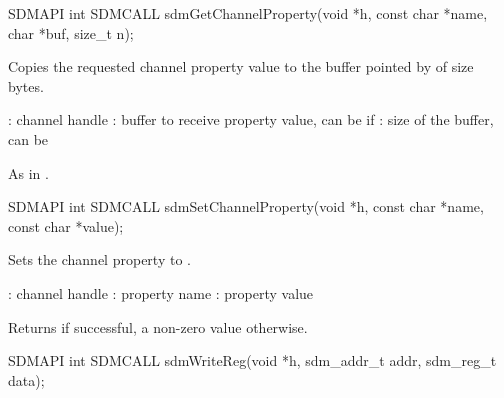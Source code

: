 \documentclass[a4paper,12pt,twoside,extrafontsizes]{memoir}
\begin{document}


\begin{cfuncprototype}
SDMAPI int SDMCALL sdmGetChannelProperty(void *h, const char *name, char *buf, size_t n);
\end{cfuncprototype}

\begin{funcdescr}
	Copies the requested channel property value to the buffer pointed by  of size  bytes.
\end{funcdescr}

\begin{funcparams}
	: channel handle
	: buffer to receive property value, can be  if 
	: size of the buffer, can be 
\end{funcparams}

\begin{funcret}
	As in .
\end{funcret}



\begin{cfuncprototype}
SDMAPI int SDMCALL sdmSetChannelProperty(void *h, const char *name, const char *value);
\end{cfuncprototype}

\begin{funcdescr}
	Sets the channel property  to .
\end{funcdescr}

\begin{funcparams}
	: channel handle
	: property name
	: property value
\end{funcparams}

\begin{funcret}
	Returns  if successful, a non-zero value otherwise.
\end{funcret}



\begin{cfuncprototype}
SDMAPI int SDMCALL sdmWriteReg(void *h, sdm_addr_t addr, sdm_reg_t data);
\end{cfuncprototype}
\end{document}
